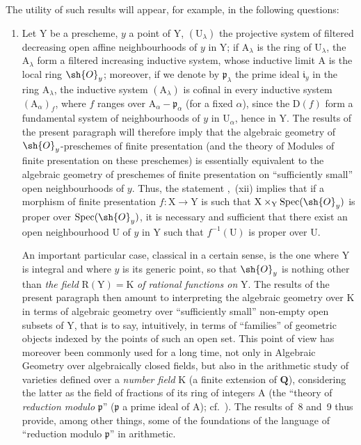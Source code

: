 \begin{env}[8.1.2]
\label{IV.8.1.2}
The utility of such results will appear, for example, in the following questions:
\begin{enumerate}[label=\emph{\alph*)}]
  \item
  Let $\mathrm{Y}$ be a prescheme, $y$ a point of $\mathrm{Y}$, $(\mathrm{U}_\lambda)$ the projective system of filtered decreasing open affine neighbourhoods of $y$ in $\mathrm{Y}$; if $\mathrm{A}_\lambda$ is the ring of $\mathrm{U}_\lambda$, the $\mathrm{A}_\lambda$ form a filtered increasing inductive system, whose inductive limit $\mathrm{A}$ is the local ring $\sh{O}_y$; moreover, if we denote by $\mathfrak{p}_\lambda$ the prime ideal $\mathfrak{i}_y$ in the ring $\mathrm{A}_\lambda$, the inductive system $(\mathrm{A}_\lambda)$ is cofinal in every inductive system $(\mathrm{A}_\alpha)_f$, where $f$ ranges over $\mathrm{A}_\alpha-\mathfrak{p}_\alpha$
(for a fixed $\alpha$), since the $\mathrm{D}(f)$ form a fundamental system of neighbourhoods of $y$ in $\mathrm{U}_\alpha$, hence in $\mathrm{Y}$.
The results of the present paragraph will therefore imply that the algebraic geometry of $\sh{O}_y$-preschemes of finite presentation (and the theory of Modules of finite presentation on these preschemes) is essentially equivalent to the algebraic geometry of preschemes of finite presentation on ``sufficiently small'' open neighbourhoods of $y$.
Thus, the statement ,~(xii) implies that if a morphism of finite presentation $f:\mathrm{X}\to\mathrm{Y}$ is such that $\mathrm{X}\times_\mathrm{Y}\operatorname{Spec}(\sh{O}_y)$ is proper over $\operatorname{Spec}(\sh{O}_y)$, it is necessary and sufficient that there exist an open neighbourhood $\mathrm{U}$ of $y$ in $\mathrm{Y}$ such that $f^{-1}(\mathrm{U})$ is proper over $\mathrm{U}$.

An important particular case, classical in a certain sense, is the one where $\mathrm{Y}$ is integral and where $y$ is its generic point, so that $\sh{O}_y$ is nothing other than \emph{the field} $\mathrm{R}(\mathrm{Y})=\mathrm{K}$ \emph{of rational functions on} $\mathrm{Y}$.
The results of the present paragraph then amount to interpreting the algebraic geometry over $\mathrm{K}$ in terms of algebraic geometry over ``sufficiently small'' non-empty open subsets of $\mathrm{Y}$, that is to say, intuitively, in terms of ``families'' of geometric objects indexed by the points of such an open set.
This point of view has moreover been commonly used for a long time, not only in Algebraic Geometry over algebraically closed fields, but also in the arithmetic study of varieties defined over a \emph{number field} $\mathrm{K}$ (a finite extension of $\mathbf{Q}$), considering the latter as the field of fractions of its ring of integers $\mathrm{A}$ (the ``theory of \emph{reduction modulo} $\mathfrak{p}$'' ($\mathfrak{p}$ a prime ideal of $\mathrm{A}$); cf.\ ).
The results of \textsection\textsection\,8 and~9 thus provide, among other things, some of the foundations of the language of ``reduction modulo $\mathfrak{p}$'' in arithmetic.


\end{enumerate}
\end{env}

